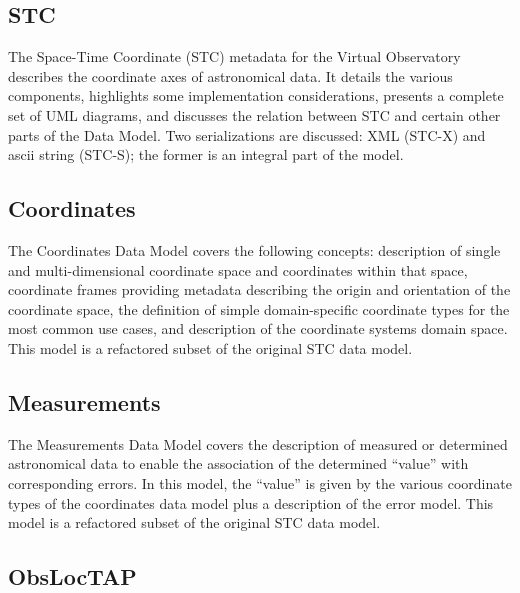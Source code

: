\documentclass[11pt,letter]{ivoa}
\begin{document}
\subsection{STC}

The Space-Time Coordinate (STC) \citep{2007ivoa.spec.1030R} metadata for
the Virtual Observatory describes the coordinate
axes of astronomical data. It details the various components, highlights
some implementation
considerations, presents a complete set of UML diagrams, and discusses
the relation between
STC and certain other parts of the Data Model. Two serializations are
discussed: XML (STC-X) and
ascii string (STC-S); the former is an integral part of the model.

\subsection{Coordinates}

The Coordinates Data Model \citep{2022ivoa.specQ1004R} 
covers the following concepts: description of single and
multi-dimensional
coordinate space and coordinates within that space, coordinate frames
providing metadata describing the
origin and orientation of the coordinate space, the definition of simple
domain-specific coordinate
types for the most common use cases, and description of the coordinate
systems domain space. This
model is a refactored subset of the original STC data model.

\subsection{Measurements}

The Measurements Data Model \citep{2022ivoa.spec.1004R} 
covers the description of measured or determined astronomical data 
to enable the association of the determined ``value'' with corresponding
errors. In this model,
the ``value'' is given by the various coordinate types of the
coordinates data model plus a
description of the error model. This model is a refactored subset of the
original STC data model.

\subsection{ObsLocTAP} 
\end{document}
